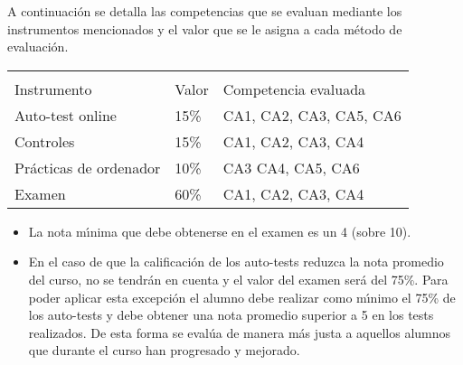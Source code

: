 A continuaci\'{o}n se detalla las competencias que  se evaluan mediante los instrumentos mencionados y el valor que se le asigna a cada m\'{e}todo de evaluaci\'{o}n.


\begin{center}
\begin{tabular}{|lll|}
 \rowcolor[rgb]{0.8,0.8,0.8}\hline&&\\[-0.6cm]
  {  Instrumento}& { Valor} & Competencia evaluada\\
 \hline\hline
{Auto-test online} & 15\% & CA1, CA2, CA3, CA5, CA6\\
{Controles} & 15\% & CA1, CA2, CA3, CA4\\
Pr\'{a}cticas de ordenador & 10\% & CA3 CA4, CA5, CA6\\
{Examen} & 60\% & CA1, CA2, CA3, CA4 \\
\hline
\end{tabular}
\end{center}

\begin{itemize}
\item La nota m\'{\i}nima que debe obtenerse en el examen es un 4 (sobre 10). 

\item En el caso de que la calificaci\'{o}n de los auto-tests reduzca la nota promedio 
del curso,  no se tendr\'{a}n en cuenta y el valor del examen ser\'{a} del 75\%. 
Para poder aplicar esta excepci\'{o}n el alumno debe realizar como m\'{\i}nimo 
el 75\% de los auto-tests y debe obtener una nota promedio superior a 5 en los tests
realizados. De esta forma se eval\'{u}a de manera m\'{a}s justa a aquellos alumnos
que durante el curso han progresado y mejorado.

\end{itemize}




%

%

